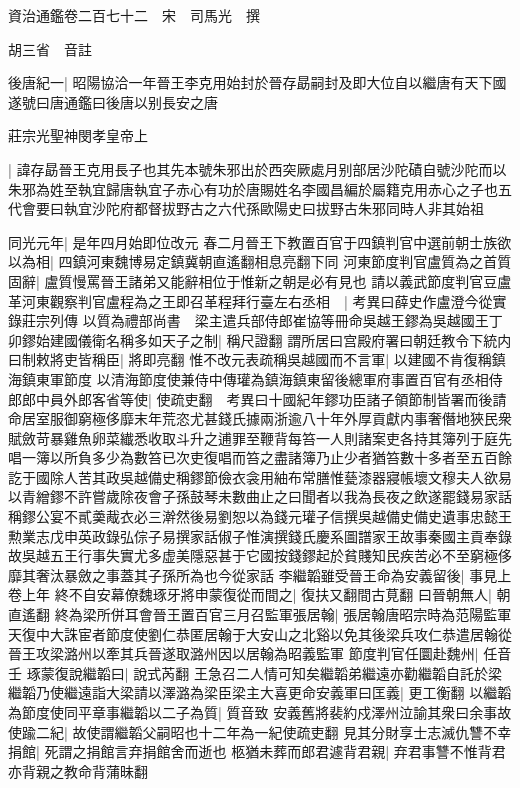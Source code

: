資治通鑑卷二百七十二　宋　司馬光　撰

胡三省　音註

後唐紀一|{
	昭陽協洽一年晉王李克用始封於晉存勗嗣封及即大位自以繼唐有天下國遂號曰唐通鑑曰後唐以别長安之唐}


莊宗光聖神閔孝皇帝上

|{
	諱存勗晉王克用長子也其先本號朱邪出於西突厥處月别部居沙陀磧自號沙陀而以朱邪為姓至執宜歸唐執宜子赤心有功於唐賜姓名李國昌編於屬籍克用赤心之子也五代會要曰執宜沙陀府都督拔野古之六代孫歐陽史曰拔野古朱邪同時人非其始祖}


同光元年|{
	是年四月始即位改元}
春二月晉王下教置百官于四鎮判官中選前朝士族欲以為相|{
	四鎮河東魏博易定鎮冀朝直遙翻相息亮翻下同}
河東節度判官盧質為之首質固辭|{
	盧質慢罵晉王諸弟又能辭相位于惟新之朝是必有見也}
請以義武節度判官豆盧革河東觀察判官盧程為之王即召革程拜行臺左右丞相　|{
	考異曰薛史作盧澄今從實錄莊宗列傳}
以質為禮部尚書　梁主遣兵部侍郎崔協等冊命吳越王鏐為吳越國王丁卯鏐始建國儀衛名稱多如天子之制|{
	稱尺證翻}
謂所居曰宫殿府署曰朝廷教令下統内曰制敕將吏皆稱臣|{
	將即亮翻}
惟不改元表疏稱吳越國而不言軍|{
	以建國不肯復稱鎮海鎮東軍節度}
以清海節度使兼侍中傳瓘為鎮海鎮東留後總軍府事置百官有丞相侍郎郎中員外郎客省等使|{
	使疏吏翻　考異曰十國紀年鏐功臣諸子領節制皆署而後請命居室服御窮極侈靡末年荒恣尤甚錢氏據兩浙逾八十年外厚貢獻内事奢僭地狹民衆賦斂苛暴雞魚卵菜纎悉收取斗升之逋罪至鞭背每笞一人則諸案吏各持其簿列于庭先唱一簿以所負多少為數笞已次吏復唱而笞之盡諸簿乃止少者猶笞數十多者至五百餘訖于國除人苦其政吳越備史稱鏐節儉衣衾用紬布常膳惟甆漆器寢帳壞文穆夫人欲易以青繒鏐不許嘗歲除夜會子孫鼓琴未數曲止之曰聞者以我為長夜之飲遂罷錢易家話稱鏐公宴不貳羮胾衣必三澣然後易劉恕以為錢元瓘子信撰吳越備史備史遺事忠懿王勲業志戊申英政錄弘倧子易撰家話俶子惟演撰錢氏慶系圖譜家王故事秦國主貢奉錄故吳越五王行事失實尤多虚美隱惡甚于它國按錢鏐起於貧賤知民疾苦必不至窮極侈靡其奢汰暴斂之事蓋其子孫所為也今從家話}
李繼韜雖受晉王命為安義留後|{
	事見上卷上年}
終不自安幕僚魏琢牙將申蒙復從而間之|{
	復扶又翻間古莧翻}
曰晉朝無人|{
	朝直遙翻}
終為梁所併耳會晉王置百官三月召監軍張居翰|{
	張居翰唐昭宗時為范陽監軍天復中大誅宦者節度使劉仁恭匿居翰于大安山之北谿以免其後梁兵攻仁恭遣居翰從晉王攻梁潞州以牽其兵晉遂取潞州因以居翰為昭義監軍}
節度判官任圜赴魏州|{
	任音壬}
琢蒙復說繼韜曰|{
	說式芮翻}
王急召二人情可知矣繼韜弟繼遠亦勸繼韜自託於梁繼韜乃使繼遠詣大梁請以澤潞為梁臣梁主大喜更命安義軍曰匡義|{
	更工衡翻}
以繼韜為節度使同平章事繼韜以二子為質|{
	質音致}
安義舊將裴約戍澤州泣諭其衆曰余事故使踰二紀|{
	故使謂繼韜父嗣昭也十二年為一紀使疏吏翻}
見其分財享士志滅仇讐不幸捐館|{
	死謂之捐館言弃捐館舍而逝也}
柩猶未葬而郎君遽背君親|{
	弃君事讐不惟背君亦背親之教命背蒲昧翻}
